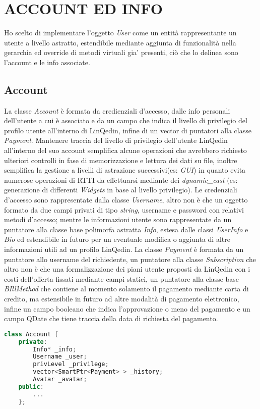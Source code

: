 \section*{ACCOUNT ED INFO}
Ho scelto di implementare l'oggetto \textit{User} come un entità rappresentante un utente a livello astratto, estendibile mediante aggiunta di funzionalità nella gerarchia ed override di metodi virtuali gia' presenti,
ciò che lo delinea sono l'account e le info associate.
\subsection*{Account}
La classe \textit{Account} è formata da credienziali d'accesso, dalle info personali dell'utente a cui è associato e da un campo
che indica il livello di privilegio del profilo utente all'interno di LinQedin, infine di un vector di puntatori alla classe \textit{Payment}.
Mantenere traccia del livello di privilegio dell'utente LinQedin all'interno del suo account semplifica alcune operazioni che avrebbero richiesto
ulteriori controlli in fase di memorizzazione e lettura dei dati su file, inoltre semplifica la gestione a livelli di astrazione successivi(es: \textit{GUI})
in quanto evita numerose operazioni di RTTI da effettuarsi mediante dei \textit{dynamic\_cast} (es: generazione di differenti \textit{Widgets} in base al livello privilegio).
Le credenziali d'accesso sono rappresentate dalla classe \textit{Username}, altro non è che un oggetto formato da due campi privati di tipo \textit{string},
username e password con relativi metodi d'accesso; mentre le informazioni utente sono rappresentate da un puntatore alla classe base polimorfa astratta \textit{Info},
estesa dalle classi \textit{UserInfo} e \textit{Bio} ed estendibile in futuro per un eventuale modifica o aggiunta di altre informazioni utili ad un profilo LinQedin.
La classe \textit{Payment} è formata da un puntatore allo username del richiedente, un puntatore alla classe \textit{Subscription} che altro non è che una formalizzazione
dei piani utente proposti da LinQedin con i costi dell'offerta fissati mediante campi statici, un puntatore alla classe base \textit{BIllMethod} che contiene al momento
solamento il pagamento mediante carta di credito, ma estensibile in futuro ad altre modalità di pagamento elettronico, infine un campo booleano che indica l'approvazione o meno
del pagamento e un campo QDate che tiene traccia della data di richiesta del pagamento.
\begin{lstlisting}[title=account.h,language=C++]
    class Account {
    private:
        Info* _info;
        Username _user;
        privLevel _privilege;
        vector<SmartPtr<Payment> > _history;
        Avatar _avatar;
    public:
        ...
    };
\end{lstlisting}
